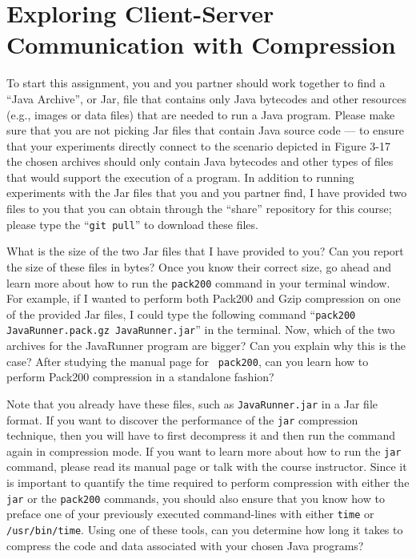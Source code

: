\section*{Exploring Client-Server Communication with Compression}

To start this assignment, you and you partner should work together to find a ``Java Archive'', or Jar, file that
contains only Java bytecodes and other resources (e.g., images or data files) that are needed to run a Java program.
Please make sure that you are not picking Jar files that contain Java source code --- to ensure that your experiments
directly connect to the scenario depicted in Figure 3-17 the chosen archives should only contain Java bytecodes and
other types of files that would support the execution of a program. In addition to running experiments with the Jar
files that you and you partner find, I have provided two files to you that you can obtain through the ``share''
repository for this course; please type the ``{\tt git pull}'' to download these files.

What is the size of the two Jar files that I have provided to you? Can you report the size of these files in bytes? Once
you know their correct size, go ahead and learn more about how to run the {\tt pack200} command in your terminal window.
For example, if I wanted to perform both Pack200 and Gzip compression on one of the provided Jar files, I could type the
following command ``{\tt pack200 JavaRunner.pack.gz JavaRunner.jar}'' in the terminal. Now, which of the two archives
for the JavaRunner program are bigger? Can you explain why this is the case? After studying the manual page for {\tt
pack200}, can you learn how to perform Pack200 compression in a standalone fashion?

Note that you already have these files, such as {\tt JavaRunner.jar} in a Jar file format. If you want to discover the
performance of the {\tt jar} compression technique, then you will have to first decompress it and then run the command
again in compression mode. If you want to learn more about how to run the {\tt jar} command, please read its manual page
or talk with the course instructor.  Since it is important to quantify the time required to perform compression with
either the {\tt jar} or the {\tt pack200} commands, you should also ensure that you know how to preface one of your
previously executed command-lines with either {\tt time} or {\tt /usr/bin/time}. Using one of these tools, can you
determine how long it takes to compress the code and data associated with your chosen Java programs?

